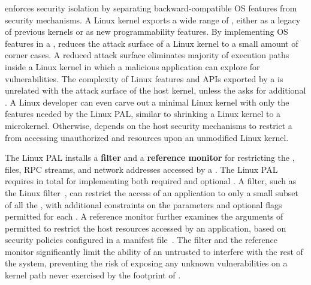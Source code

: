 \graphene{} enforces security isolation %
by separating 
backward-compatible OS features from security mechanisms.
A Linux kernel exports a wide range of \linuxapis{},
either as a legacy of previous kernels or as new programmability features. %
By implementing OS features in a \libos{},
\graphene{} reduces the attack surface of a Linux kernel
to a small amount of \linuxapi{} corner cases.
A reduced attack surface
eliminates majority of execution paths inside a Linux kernel in which a malicious application can explore for vulnerabilities.
The complexity of Linux features and APIs exported by a \libos{} is unrelated with the attack surface of the host kernel,
unless the \libos{} asks for additional \hostapis{}.
A Linux developer can even carve out a minimal Linux kernel with only the features needed by the Linux PAL,
similar to shrinking a Linux kernel to a microkernel.
Otherwise, \graphene{} depends on the host security mechanisms to restrict a \libos{} from accessing unauthorized \linuxapis{} and resources upon an unmodified Linux kernel.





The Linux PAL installs a {\bf \linuxapi{} filter} and a {\bf reference monitor}
for restricting the \linuxapis{}, files, RPC streams, and network addresses
accessed by a \picoproc{}.
The Linux PAL requires \hostsyscallnum{} \linuxapis{} in total
for implementing both required and optional \hostapis{}.
A \linuxapi{} filter, such as the Linux \seccomp{} filter~\cite{seccomp},
can restrict the \linuxapi{} access of an application
to only a small subset of all the \linuxapis{}, with additional constraints on the parameters and optional flags permitted for each \linuxapi{}.
A reference monitor further examines the arguments of permitted \linuxapis{} to restrict the host resources accessed by an application, based on security policies configured in a manifest file~\cite{hunt07rethink}.
The \linuxapi{} filter and the reference monitor
significantly limit the ability of an untrusted \graphene{} \picoproc{} to interfere with the rest of the system,
preventing the risk of exposing any unknown vulnerabilities
on a kernel path never exercised by the \linuxapi{} footprint of \graphene{}.



